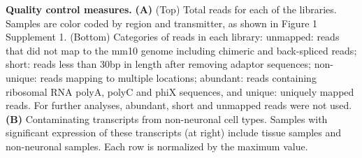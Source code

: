 \textbf{Quality control measures.} \textbf{(A)} (Top) Total reads for each of the libraries. Samples are color coded by region and transmitter, as shown in Figure 1 Supplement 1. (Bottom) Categories of reads in each library: unmapped: reads that did not map to the mm10 genome including chimeric and back-spliced reads; short: reads less than 30bp in length after removing adaptor sequences; non-unique: reads mapping to multiple locations; abundant: reads containing ribosomal RNA polyA, polyC and phiX sequences, and unique: uniquely mapped reads. For further analyses, abundant, short and unmapped reads were not used.
\textbf{(B)} Contaminating transcripts from non-neuronal cell types. Samples with significant expression of these transcripts (at right) include tissue samples and non-neuronal samples. Each row is normalized by the maximum value. 
